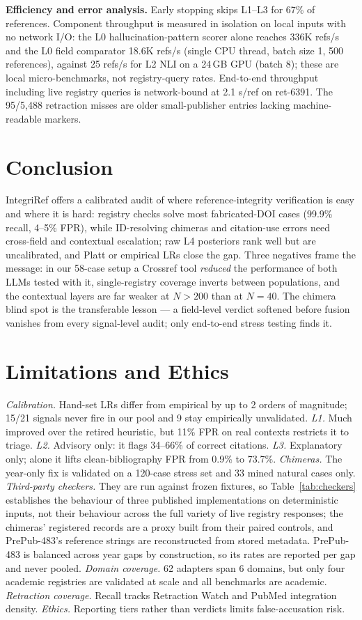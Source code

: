 \documentclass[letterpaper]{article} %
\begin{document}
\noindent\textbf{Efficiency and error analysis.} Early stopping skips L1--L3 for 67\% of references. Component throughput is measured in isolation on local inputs with no network I/O: the L0 hallucination-pattern scorer alone reaches 336K refs/s and the L0 field comparator 18.6K refs/s (single CPU thread, batch size 1, 500 references), against 25 refs/s for L2 NLI on a 24\,GB GPU (batch 8); these are local micro-benchmarks, not registry-query rates. End-to-end throughput including live registry queries is network-bound at 2.1 s/ref on ret-6391. The 95/5{,}488 retraction misses are older small-publisher entries lacking machine-readable markers.

\section{Conclusion}

IntegriRef offers a calibrated audit of where reference-integrity verification is easy and where it is hard: registry checks solve most fabricated-DOI cases (99.9\% recall, 4--5\% FPR), while ID-resolving chimeras and citation-use errors need cross-field and contextual escalation; raw L4 posteriors rank well but are uncalibrated, and Platt or empirical LRs close the gap. Three negatives frame the message: in our 58-case setup a Crossref tool \emph{reduced} the performance of both LLMs tested with it, single-registry coverage inverts between populations, and the contextual layers are far weaker at $N{>}200$ than at $N{=}40$. The chimera blind spot is the transferable lesson --- a field-level verdict softened before fusion vanishes from every signal-level audit; only end-to-end stress testing finds it.

\section*{Limitations and Ethics}
\emph{Calibration.} Hand-set LRs differ from empirical by up to 2 orders of magnitude; 15/21 signals never fire in our pool and 9 stay empirically unvalidated. \emph{L1.} Much improved over the retired heuristic, but 11\% FPR on real contexts restricts it to triage. \emph{L2.} Advisory only: it flags 34--66\% of correct citations. \emph{L3.} Explanatory only; alone it lifts clean-bibliography FPR from 0.9\% to 73.7\%. \emph{Chimeras.} The year-only fix is validated on a 120-case stress set and 33 mined natural cases only. \emph{Third-party checkers.} They are run against frozen fixtures, so Table~\ref{tab:checkers} establishes the behaviour of three published implementations on deterministic inputs, not their behaviour across the full variety of live registry responses; the chimeras' registered records are a proxy built from their paired controls, and PrePub-483's reference strings are reconstructed from stored metadata. PrePub-483 is balanced across year gaps by construction, so its rates are reported per gap and never pooled. \emph{Domain coverage.} 62 adapters span 6 domains, but only four academic registries are validated at scale and all benchmarks are academic. \emph{Retraction coverage.} Recall tracks Retraction Watch and PubMed integration density. \emph{Ethics.} Reporting tiers rather than verdicts limits false-accusation risk.



\end{document}
